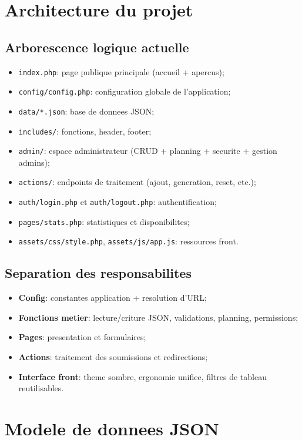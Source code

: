 \documentclass[12pt,a4paper]{article}
\begin{document}
\section{Architecture du projet}
\subsection{Arborescence logique actuelle}
\begin{itemize}[leftmargin=1.2cm]
    \item \texttt{index.php}: page publique principale (accueil + apercus);
    \item \texttt{config/config.php}: configuration globale de l'application;
    \item \texttt{data/*.json}: base de donnees JSON;
    \item \texttt{includes/}: fonctions, header, footer;
    \item \texttt{admin/}: espace administrateur (CRUD + planning + securite + gestion admins);
    \item \texttt{actions/}: endpoints de traitement (ajout, generation, reset, etc.);
    \item \texttt{auth/login.php} et \texttt{auth/logout.php}: authentification;
    \item \texttt{pages/stats.php}: statistiques et disponibilites;
    \item \texttt{assets/css/style.php}, \texttt{assets/js/app.js}: ressources front.
\end{itemize}

\subsection{Separation des responsabilites}
\begin{itemize}[leftmargin=1.2cm]
    \item \textbf{Config}: constantes application + resolution d'URL;
    \item \textbf{Fonctions metier}: lecture/criture JSON, validations, planning, permissions;
    \item \textbf{Pages}: presentation et formulaires;
    \item \textbf{Actions}: traitement des soumissions et redirections;
    \item \textbf{Interface front}: theme sombre, ergonomie unifiee, filtres de tableau reutilisables.
\end{itemize}

\section{Modele de donnees JSON}
\end{document}
